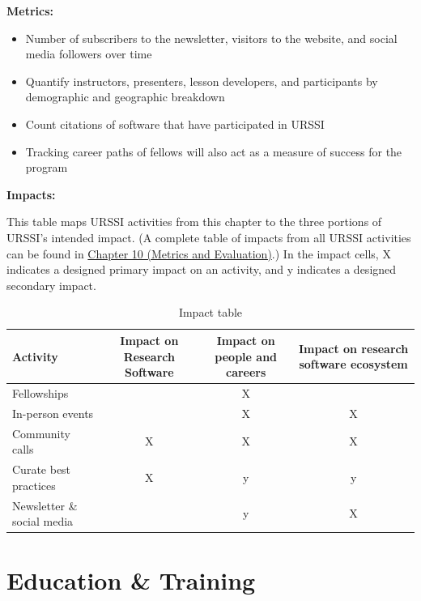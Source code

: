 \documentclass[
]{book}
\providecommand{\tightlist}{%
  \setlength{\itemsep}{0pt}\setlength{\parskip}{0pt}}
\begin{document}
\textbf{Metrics:}

\begin{itemize}
\tightlist
\item
  Number of subscribers to the newsletter, visitors to the website, and social media followers over time
\item
  Quantify instructors, presenters, lesson developers, and participants by demographic and geographic breakdown
\item
  Count citations of software that have participated in URSSI
\item
  Tracking career paths of fellows will also act as a measure of success for the program
\end{itemize}

\textbf{Impacts:}

This table maps URSSI activities from this chapter to the three portions of URSSI's intended impact.
(A complete table of impacts from all URSSI activities can be found in \href{Ch-Metrics}{Chapter 10 (Metrics and Evaluation)}.)
In the impact cells, X indicates a designed primary impact on an activity, and y indicates
a designed secondary impact.

\begin{table}

\caption{\label{tab:unnamed-chunk-1}Impact table}
\centering
\begin{tabular}[t]{lccc}
\toprule
Activity & Impact on Research Software & Impact on people and careers & Impact on research software ecosystem\\
\midrule
Fellowships &  & X & \\
In-person events &  & X & X\\
Community calls & X & X & X\\
Curate best practices & X & y & y\\
Newsletter \& social media &  & y & X\\
\bottomrule
\end{tabular}
\end{table}

\hypertarget{Ch-Edu}{%
\chapter{Education \& Training}\label{Ch-Edu}}
\end{document}
